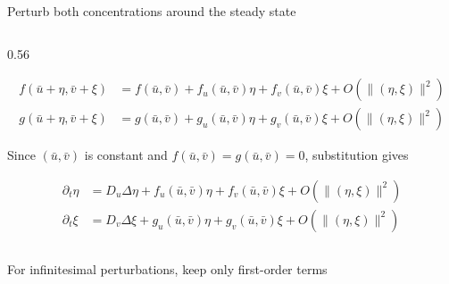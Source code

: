 \begin{frame}{Perturb both concentrations around the steady state}
\begin{columns}[T,onlytextwidth]
\begin{column}{0.56\textwidth}
      \vspace{-0.30cm}

      {\color{HydraWhite}\fontsize{7.2}{8.9}\selectfont
      \begin{align*}
        f(\bar u+\eta,\bar v+\xi)
        &=f(\bar u,\bar v)
        +f_u(\bar u,\bar v)\eta
        +f_v(\bar u,\bar v)\xi
        +O\!\left(\lVert(\eta,\xi)\rVert^2\right)
        \\
        g(\bar u+\eta,\bar v+\xi)
        &=g(\bar u,\bar v)
        +g_u(\bar u,\bar v)\eta
        +g_v(\bar u,\bar v)\xi
        +O\!\left(\lVert(\eta,\xi)\rVert^2\right)
      \end{align*}
      }

      \vspace{-0.34cm}

      {\color{HydraMuted}\fontsize{7.2}{8.8}\selectfont
        Since $(\bar u,\bar v)$ is constant and
        $f(\bar u,\bar v)=g(\bar u,\bar v)=0$, substitution gives
      \par}

      \vspace{-0.32cm}

      {\color{HydraWhite}\fontsize{7.2}{8.9}\selectfont
      \begin{align*}
        \partial_t\eta
        &=D_u\Delta\eta
        +f_u(\bar u,\bar v)\eta
        +f_v(\bar u,\bar v)\xi
        +O\!\left(\lVert(\eta,\xi)\rVert^2\right)
        \\
        \partial_t\xi
        &=D_v\Delta\xi
        +g_u(\bar u,\bar v)\eta
        +g_v(\bar u,\bar v)\xi
        +O\!\left(\lVert(\eta,\xi)\rVert^2\right)
      \end{align*}
      }

    \end{column}

  \end{columns}

  \vspace{-0.14cm}

  {\color{HydraMuted}\fontsize{7.7}{9.4}\selectfont
    For infinitesimal perturbations, keep only first-order terms
  \par}

  \vspace{-0.30cm}


\end{frame}
